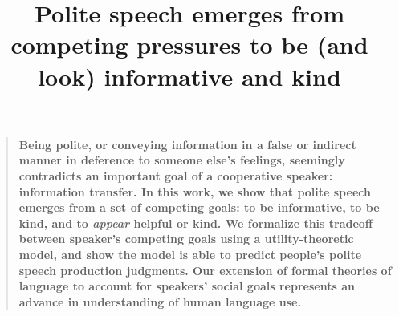 \documentclass[12pt]{article}
\title{Polite speech emerges from competing pressures to be (and look)
informative and kind}
\author
%
{Erica J. Yoon,$^{1\ast\dagger}$ Michael Henry Tessler,$^{1\ast}$ Noah D. Goodman,$^{1}$ Michael C. Frank$^{1}$\\
\\
\normalsize{$^{1}$Department of Psychology, Stanford University,}\\
\normalsize{450 Serra Mall, Stanford, CA 94305.}
\\
\normalsize{$^\ast$These authors contributed equally to this work.}
\\
\normalsize{$^\dagger$To whom correspondence should be addressed; E-mail: ejyoon@stanford.edu.}
}
\date{}
\newenvironment{sciabstract}{%
\begin{quote} \bf}
{\end{quote}}
\begin{document}
 


\baselineskip24pt


\maketitle 




\begin{sciabstract}
Being polite, or conveying information in a false or indirect manner in
deference to someone else's feelings, seemingly contradicts an important
goal of a cooperative speaker: information transfer. In this work, we
show that polite speech emerges from a set of competing goals: to be
informative, to be kind, and to \emph{appear} helpful or kind. We
formalize this tradeoff between speaker's competing goals using a
utility-theoretic model, and show the model is able to predict people's
polite speech production judgments. Our extension of formal theories of
language to account for speakers' social goals represents an advance in
understanding of human language use.
\end{sciabstract}

\end{document}
